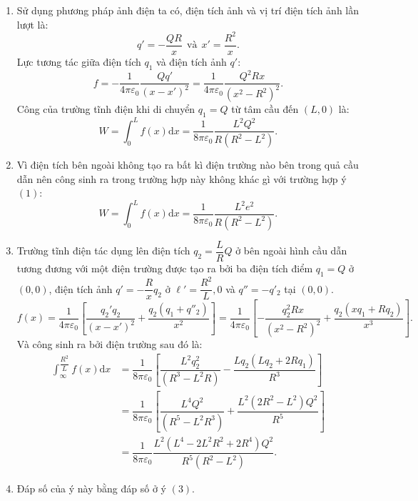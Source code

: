 \begin{loigiai}
\begin{enumerate}[1)]
    \item Sử dụng phương pháp ảnh điện ta có, điện tích ảnh và vị trí điện tích ảnh lần lượt là:
    \[q'=-\dfrac{QR}{x}~~\text{và}~~x'=\dfrac{R^2}{x}.\]
    Lực tương tác giữa điện tích $q_1$ và điện tích ảnh $q'$:
    \[f=-\dfrac{1}{4\pi\varepsilon_0}\dfrac{Qq'}{(x-x')^2}=\dfrac{1}{4\pi\varepsilon_0}\dfrac{Q^2Rx}{(x^2-R^2)^2}.\]
    Công của trường tĩnh điện khi di chuyển $q_1=Q$ từ tâm cầu đến $(L,0)$ là:
    \[W=\int_{0}^{L}f(x)\mathrm{d}x=\dfrac{1}{8\pi\varepsilon_0}\dfrac{L^2Q^2}{R(R^2-L^2)}.\]
    \item Vì điện tích bên ngoài không tạo ra bất kì điện trường nào bên trong quả cầu dẫn nên công sinh ra trong trường hợp này không khác gì với trường hợp ý $(1)$:
    \[W=\int_{0}^{L}f(x)\mathrm{d}x=\dfrac{1}{8\pi\varepsilon_0}\dfrac{L^2e^2}{R(R^2-L^2)}.\]
    \item Trường tĩnh điện tác dụng lên điện tích $q_2=\dfrac{L}{R}Q$ ở bên ngoài hình cầu dẫn tương đương với một điện trường được tạo ra bởi ba điện tích điểm $q_1=Q$ ở $(0,0)$, điện tích ảnh $q'=-\dfrac{R}{x}q_2$ ở $\ell'=\dfrac{R^2}{L},0$ và $q''=-q'_2$ tại $(0,0)$.
    \[f(x)=\dfrac{1}{4\pi\varepsilon_0}\left[\dfrac{q_2'q_2}{(x-x')^2}+\dfrac{q_2(q_1+q''_2)}{x^2}\right]=\dfrac{1}{4\pi\varepsilon_0}\left[-\dfrac{q_2^2Rx}{(x^2-R^2)^2}+\dfrac{q_2(xq_1+Rq_2)}{x^3}\right].\]
    Và công sinh ra bởi điện trường sau đó là:
    \begin{align*}
        \int_{\infty}^{\dfrac{R^2}{L}}f(x)\mathrm{d}x&=\dfrac{1}{8\pi\varepsilon_0}\left[\dfrac{L^2q^2_2}{(R^3-L^2R)}-\dfrac{Lq_2(Lq_2+2Rq_1)}{R^3}\right]\\
        &=\dfrac{1}{8\pi\varepsilon_0}\left[\dfrac{L^4Q^2}{(R^5-L^2R^3)}+\dfrac{L^2(2R^2-L^2)Q^2}{R^5}\right]\\
        &=\dfrac{1}{8\pi\varepsilon_0}\dfrac{L^2(L^4-2L^2R^2+2R^4)Q^2}{R^5(R^2-L^2)}.
    \end{align*}
    
    \item Đáp số của ý này bằng đáp số ở ý $(3)$.
\end{enumerate}
\end{loigiai}

